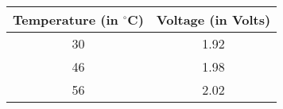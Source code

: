 
\begin{center}
\begin{tabular}{|c|c|}
\hline
\textbf{Temperature (in $^{\circ}$C)} & \textbf{Voltage (in Volts)} \\ \hline
30	    &   1.92 \\ \hline
46		&   1.98 \\ \hline
56 		&   2.02 \\ \hline
\end{tabular}
\end{center}
